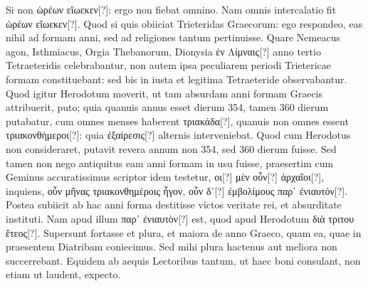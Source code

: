 Si non \textgreek{ὡρέων εἵωεκεν[?]}: ergo non fiebat
omnino.
Nam omnis intercalatio fit \textgreek{ὡρέων εἵωεκεν[?]}.
Quod si quis
obiiciat Trieteridas Graecorum: ego respondeo, eas nihil ad formam
anni, sed ad religiones tantum pertinuisse.
Quare Nemeacus agon,
Isthmiacus, Orgia Thebanorum, Dionysia \textgreek{ἐν Λίμναις[?]}
 anno tertio Tetraeteridis
celebrabantur, non autem ipsa peculiarem periodi Trietericae
formam constituebant: sed bis in iusta et legitima Tetraeteride
observabantur.
Quod igitur Herodotum moverit, ut tam absurdam
anni formam Graecis attribuerit, puto; quia quanuis annus esset dierum
354, tamen 360 dierum putabatur, cum omnes menses haberent
\textgreek{τριακάδα[?]}, quanuis non omnes essent
 \textgreek{τριακονθήμεροι[?]}: quia \textgreek{ἐξαίρεσις[?]}
alternis interveniebat.
Quod cum Herodotus non consideraret, putavit
revera annum non 354, sed 360 dierum fuisse.
Sed tamen non
nego antiquitus eam anni formam in usu fuisse, praesertim cum Geminus
accuratissimus scriptor idem testetur,
 \textgreek{οι[?] μὲν οὖν[?] ἀρχαῖοι[?]}, inquiens,
\textgreek{οὖν μῆνας τριακονθημέροις ἦγον,
 οὖν δ᾽[?] ἐμβολίμους παρ᾽ ἐνιαυτόν[?]}.
Postea subiicit ab hac anni forma destitisse victos veritate rei,
 et absurditate
instituti.
Nam apud illum \textgreek{παρ᾽ ἐνιαυτὸν[?]} est, quod apud Herodotum
\textgreek{διὰ τριτου ἔτεος[?]}.
Supersunt fortasse et plura, et maiora de
anno Graeco, quam ea, quae in praesentem Diatribam coniecimus.
Sed mihi plura hactenus aut meliora non succerrebant.
Equidem ab
aequis Lectoribus tantum, ut haec boni consulant, non etiam ut laudent,
expecto.
